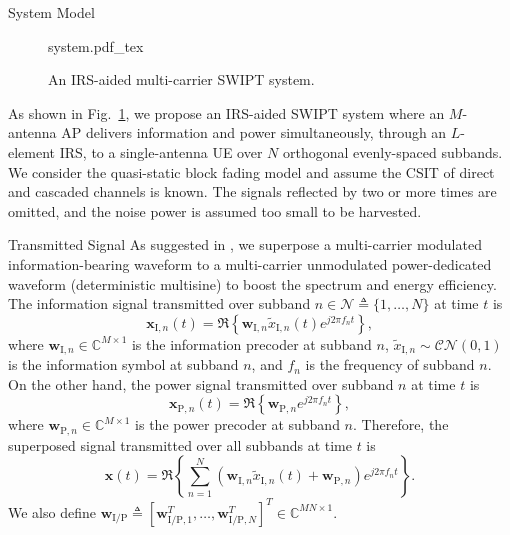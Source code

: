 \documentclass[journal]{IEEEtran}
\begin{document}
	\begin{section}{System Model}\label{se:system_model}
		\begin{figure}[!t]
			\centering
			\def\svgwidth{0.9\columnwidth}
			{system.pdf_tex}
			\caption{An IRS-aided multi-carrier SWIPT system.}
			\label{fi:system}
		\end{figure}

		As shown in Fig.~\ref{fi:system}, we propose an IRS-aided SWIPT system where an $M$-antenna AP delivers information and power simultaneously, through an $L$-element IRS, to a single-antenna UE over $N$ orthogonal evenly-spaced subbands. We consider the quasi-static block fading model and assume the CSIT of direct and cascaded channels is known. The signals reflected by two or more times are omitted, and the noise power is assumed too small to be harvested.


		\begin{subsection}{Transmitted Signal}
			As suggested in \cite{Clerckx2018b}, we superpose a multi-carrier modulated information-bearing waveform to a multi-carrier unmodulated power-dedicated waveform (deterministic multisine) to boost the spectrum and energy efficiency. The information signal transmitted over subband $n \in \mathcal{N} \triangleq \{1, \dots, N\}$ at time $t$ is
			\begin{equation}
				\boldsymbol{x}_{\mathrm{I},n}(t) = \Re\left\{\boldsymbol{w}_{\mathrm{I},n} \tilde{x}_{\mathrm{I},n}(t) e^{j2{\pi}{f_n}{t}}\right\},
			\end{equation}
			where $\boldsymbol{w}_{\mathrm{I},n} \in \mathbb{C}^{M \times 1}$ is the information precoder at subband $n$, $\tilde{x}_{\mathrm{I},n}\sim\mathcal{CN}(0,1)$ is the information symbol at subband $n$, and $f_n$ is the frequency of subband $n$. On the other hand, the power signal transmitted over subband $n$ at time $t$ is
			\begin{equation}
				\boldsymbol{x}_{\mathrm{P},n}(t) = \Re\left\{\boldsymbol{w}_{\mathrm{P},n} e^{j2{\pi}{f_n}{t}}\right\},
			\end{equation}
			where $\boldsymbol{w}_{\mathrm{P},n} \in \mathbb{C}^{M \times 1}$ is the power precoder at subband $n$. Therefore, the superposed signal transmitted over all subbands at time $t$ is
			\begin{equation}
				\boldsymbol{x}(t) = \Re{\left\{\sum_{n=1}^N(\boldsymbol{w}_{\mathrm{I},n}\tilde{x}_{\mathrm{I},n}(t)+\boldsymbol{w}_{\mathrm{P},n}){e^{j2{\pi}{f_n}{t}}}\right\}}.
			\end{equation}
			We also define $\boldsymbol{w}_{\mathrm{I/P}} \triangleq [\boldsymbol{w}_{\mathrm{I/P},1}^T,\dots,\boldsymbol{w}_{\mathrm{I/P},N}^T]^T \in \mathbb{C}^{MN \times 1}$.
		\end{subsection}



\end{section}
\end{document}
